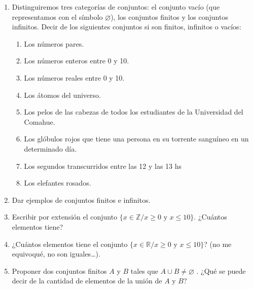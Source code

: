 \documentclass[12pt]{article}
\theoremstyle{definition}
\begin{document}
\begin{enumerate}
\item Distinguiremos tres categorías de conjuntos: el conjunto vacío (que representamos con el símbolo $\varnothing$), los conjuntos finitos y los conjuntos infinitos.  Decir de los siguientes conjuntos si son finitos, infinitos o vacíos:
\begin{enumerate}
\setlength\itemsep{0em}
\item Los números pares.
\item Los números enteros entre 0 y 10.
\item Los números reales entre 0 y 10.
\item Los átomos del universo.
\item Los pelos de las cabezas de todos los estudiantes de la Universidad del Comahue.
\item Los glóbulos rojos que tiene una persona en su torrente sanguíneo en un determinado día.
\item Los segundos transcurridos entre las 12 y las 13 hs
\item Los elefantes rosados.
\end{enumerate}

\item Dar ejemplos de conjuntos finitos e infinitos.

\item 	Escribir por extensión el conjunto $\{x \in \mathbb{Z} /  x \geq 0  \text{ y } x \leq 10\}$. ¿Cuántos elementos tiene?

\item 	¿Cuántos elementos tiene el conjunto $\{x \in \mathbb{R} /  x \geq 0   \text{ y }  x \leq 10\}$? (no me equivoqué, no son iguales…).

\item Proponer dos conjuntos finitos $A$ y $B$ tales que $A \cup B \neq \varnothing$ . ¿Qué se puede decir de la cantidad de elementos de la unión de $A$ y $B$? 
\end{enumerate}
\end{document}
